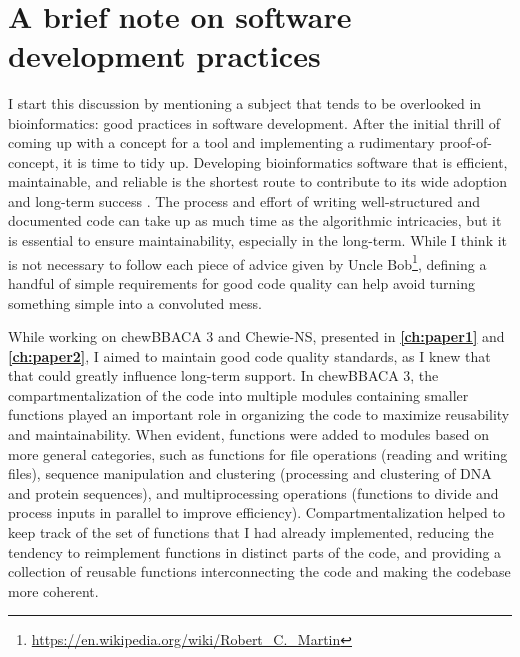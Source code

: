 \renewcommand*{\thefootnote}{\arabic{footnote}}

\mbox{}\\
\vspace{8cm}

\section{A brief note on software development practices}

I start this discussion by mentioning a subject that tends to be overlooked in bioinformatics: good practices in software development. After the initial thrill of coming up with a concept for a tool and implementing a rudimentary proof-of-concept, it is time to tidy up. Developing bioinformatics software that is efficient, maintainable, and reliable is the shortest route to contribute to its wide adoption and long-term success \cite{jimenez_four_2017, coelho_for_2024}. The process and effort of writing well-structured and documented code can take up as much time as the algorithmic intricacies, but it is essential to ensure maintainability, especially in the long-term. While I think it is not necessary to follow each piece of advice given by Uncle Bob\footnote{\url{https://en.wikipedia.org/wiki/Robert_C._Martin}}, defining a handful of simple requirements for good code quality can help avoid turning something simple into a convoluted mess.

While working on chewBBACA 3 and Chewie-NS, presented in \textbf{\autoref{ch:paper1}} and \textbf{\autoref{ch:paper2}}, I aimed to maintain good code quality standards, as I knew that that could greatly influence long-term support. In chewBBACA 3, the compartmentalization of the code into multiple modules containing smaller functions played an important role in organizing the code to maximize reusability and maintainability. When evident, functions were added to modules based on more general categories, such as functions for file operations (reading and writing files), sequence manipulation and clustering (processing and clustering of DNA and protein sequences), and multiprocessing operations (functions to divide and process inputs in parallel to improve efficiency). Compartmentalization helped to keep track of the set of functions that I had already implemented, reducing the tendency to reimplement functions in distinct parts of the code, and providing a collection of reusable functions interconnecting the code and making the codebase more coherent.

